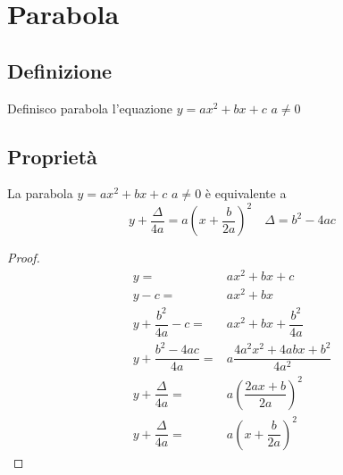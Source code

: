 \chapter{Parabola}
\section{Definizione}
\begin{defn}
Definisco parabola l'equazione $y=ax^2+bx+c$ $a\neq0$
\end{defn}
\section{Proprietà}
\begin{thm}
	La parabola $y=ax^2+bx+c$ $a\neq0$ è equivalente a \begin{equation*}
	y+\dfrac{\Delta}{4a}=a\left(x+\dfrac{b}{2a}\right)^2\quad\Delta=b^2-4ac
	\end{equation*}\label{equa:Parabola_scomposizione}
\end{thm}
\begin{proof}
	\begin{align*}
	y=&ax^2+bx+c\\
	y-c=&ax^2+bx\\
	y+\dfrac{b^2}{4a}-c=&ax^2+bx+\dfrac{b^2}{4a}\\
	y+\dfrac{b^2-4ac}{4a}=&a\dfrac{4a^2x^2+4abx+b^2}{4a^2}\\
	y+\dfrac{\Delta}{4a}=&a\left(\dfrac{2ax+b}{2a}\right)^2\\
	y+\dfrac{\Delta}{4a}=&a\left(x+\dfrac{b}{2a}\right)^2
	\end{align*}
\end{proof}